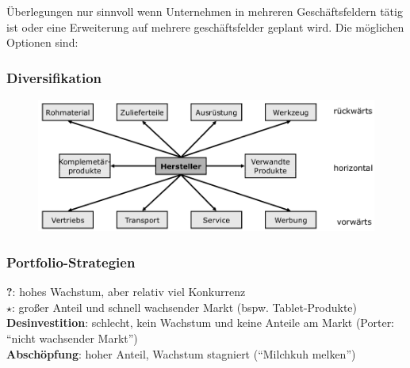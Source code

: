 \documentclass[a4paper,11pt, twoside]{article}
\begin{document}
Überlegungen nur sinnvoll wenn Unternehmen in mehreren Geschäftsfeldern tätig ist oder eine Erweiterung auf mehrere geschäftsfelder geplant wird. 
Die möglichen Optionen sind:

\subsubsection*{Diversifikation} 
\begin{figure}[h]
 \begin{center}
   \includegraphics[scale=0.3]{bilder/diversifikation.png}
 \end{center}
\end{figure}
\newpage

\subsubsection*{Portfolio-Strategien} 

\textbf{?}: hohes Wachstum, aber relativ viel Konkurrenz\\
\textbf{$\star$}: großer Anteil und schnell wachsender Markt (bspw. Tablet-Produkte)\\
\textbf{Desinvestition}: schlecht, kein Wachstum und keine Anteile am Markt (Porter: "`nicht wachsender Markt"')\\ 
\textbf{Abschöpfung}: hoher Anteil, Wachstum stagniert ("`Milchkuh melken"')
\end{document}
